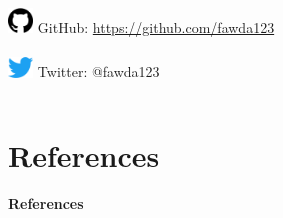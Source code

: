 \documentclass[serif]{beamer}\usepackage[]{graphicx}\usepackage[]{color}
\begin{document}
\begin{frame}
\begin{columns}
\begin{column}{0.6\textwidth}
\includegraphics[width = 0.05\textwidth]{fig/git.png} GitHub: \href{https://github.com/fawda123}{https://github.com/fawda123}\\~\\
\includegraphics[width = 0.05\textwidth]{fig/twitter.png} Twitter: @fawda123
\end{column}
\end{columns}
\vspace{0.2in}
\end{frame}

\section{References}
\begin{frame}[allowframebreaks,t]{\textbf{References}}
\tiny
{}


\end{frame}
\end{document}
